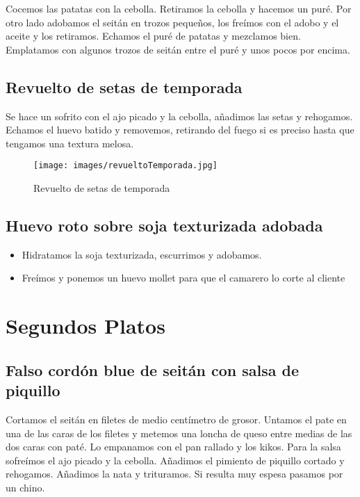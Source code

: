 Cocemos las patatas con la cebolla. Retiramos la cebolla y hacemos un puré.
Por otro lado adobamos el seitán en trozos pequeños, los freímos con el adobo y el aceite y los retiramos. Echamos el puré de patatas y mezclamos bien. Emplatamos con algunos trozos de seitán entre el puré y unos pocos por encima.

\newpage
\subsection{Revuelto de setas de temporada}
\label{sec:revueltoTemporada}

Se hace un sofrito con el ajo picado y la cebolla, añadimos las setas y rehogamos. Echamos el huevo batido  y removemos, retirando del fuego si es preciso hasta que tengamos una textura melosa.

\begin{figure}[h]
  \begin{center}
    \texttt{[image: images/revueltoTemporada.jpg]}
    \caption{Revuelto de setas de temporada}
    \label{fig:revueltoTemporada}
  \end{center}
\end{figure}


\subsection{Huevo roto sobre soja texturizada adobada}
\label{sec:huevo}
\begin{itemize}
\item Hidratamos la soja texturizada, escurrimos y adobamos.
\item Freímos y ponemos un huevo mollet para que el camarero  lo corte al cliente
\end{itemize}

\section{Segundos Platos}
\label{sec:segundos}

\subsection{Falso cordón blue de seitán con salsa de piquillo}
\label{sec:cordon}

Cortamos el seitán en filetes de medio centímetro de grosor. Untamos el pate en una de las caras de los filetes y metemos una loncha de queso entre medias de las dos caras con paté. Lo empanamos con el pan rallado y los kikos. 
Para la salsa sofreímos el ajo picado y la cebolla. Añadimos el pimiento de piquillo cortado y rehogamos. Añadimos la nata y trituramos. Si resulta muy espesa pasamos por un chino.

